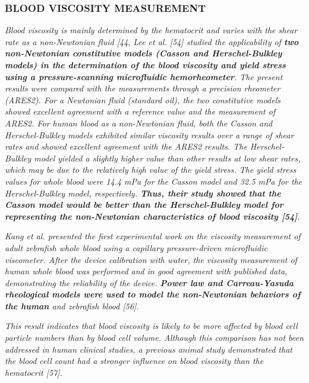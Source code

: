 \documentclass[11pt,letterpaper]{article}
\begin{document}
\subsubsection*{BLOOD VISCOSITY MEASUREMENT} \textit{Blood viscosity is mainly determined by the hematocrit and varies with the shear rate as a non-Newtonian fluid [44,} \newline\newline
\textit{Lee et al. [54] studied the applicability of \textbf{two non-Newtonian constitutive models ({\color{red}Casson} and {\color{red}Herschel-Bulkley models}) in the determination of the blood viscosity and yield stress using a pressure-scanning microfluidic hemorheometer}. The present results were compared with the measurements through a precision rheometer (ARES2). For a Newtonian fluid (standard oil), the two constitutive models showed excellent agreement with a reference value and the measurement of ARES2. For human blood as a non-Newtonian fluid, both the Casson and Herschel-Bulkley models exhibited similar viscosity results over a range of shear rates and showed excellent agreement with the ARES2 results. The Herschel-Bulkley model yielded a slightly higher value than other results at low shear rates, which may be due to the relatively high value of the yield stress. The yield stress values for whole blood were 14.4 mPa for the Casson model and 32.5 mPa for the Herschel-Bulkley model, respectively. {\color{blue}\textbf{Thus, their study showed that the {\color{red}Casson model} would be better than the {\color{red}Herschel-Bulkley model} for representing the non-Newtonian characteristics of blood viscosity [54]}}.}

\textit{Kang et al. presented the first experimental work on the viscosity measurement of adult zebrafish whole blood using a capillary pressure-driven microfluidic viscometer. After the device calibration with water, the viscosity measurement of human whole blood was performed and in good agreement with published data, demonstrating the reliability of the device. \textbf{{\color{red}Power law} and {\color{red}Carreau-Yasuda rheological} models were used to model the non-Newtonian behaviors of the human }and zebrafish blood [56].}


\textit{This result indicates that blood viscosity is likely to be more affected by blood cell particle numbers than by blood cell volume. Although this comparison has not been addressed in human clinical studies, a previous animal study demonstrated that the blood cell count had a stronger influence on blood viscosity than the hematocrit [57].}
\end{document}
